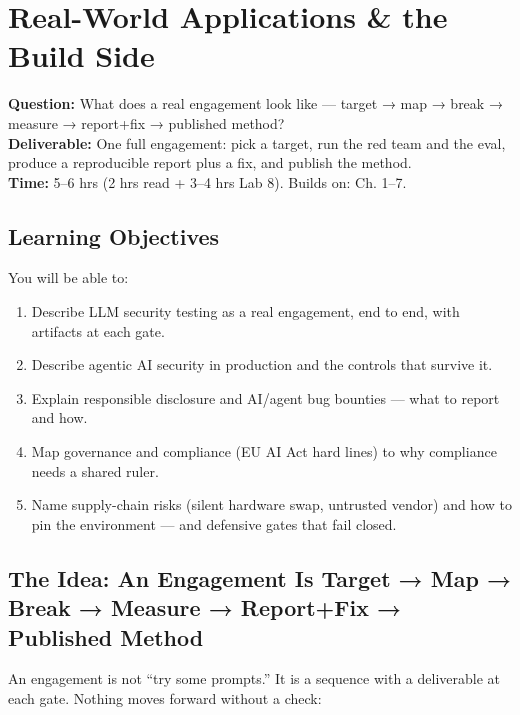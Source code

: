\chapter{Real-World Applications \& the Build Side}
\label{ch:8}

\begin{tcolorbox}[colback=white,colframe=checkblack,title=Chapter 8 at a Glance,fonttitle=\bfseries,sharp corners,boxrule=1pt]
\textbf{Question:} What does a real engagement look like — target → map → break → measure → report+fix → published method?\\
\textbf{Deliverable:} One full engagement: pick a target, run the red team and the eval, produce a reproducible report plus a fix, and publish the method.\\
\textbf{Time:} 5–6 hrs (2 hrs read + 3–4 hrs Lab 8). Builds on: Ch. 1–7.
\end{tcolorbox}

\section{Learning Objectives}
\fbadge
You will be able to:
\begin{enumerate}
\item Describe LLM security testing as a real engagement, end to end, with artifacts at each gate.
\item Describe agentic AI security in production and the controls that survive it.
\item Explain responsible disclosure and AI/agent bug bounties — what to report and how.
\item Map governance and compliance (EU AI Act hard lines) to why compliance needs a shared ruler.
\item Name supply-chain risks (silent hardware swap, untrusted vendor) and how to pin the environment — and defensive gates that fail closed.
\end{enumerate}

\section{The Idea: An Engagement Is Target → Map → Break → Measure → Report+Fix → Published Method}
\tierF

An engagement is not ``try some prompts.'' It is a sequence with a deliverable at each gate. Nothing moves forward without a check:

